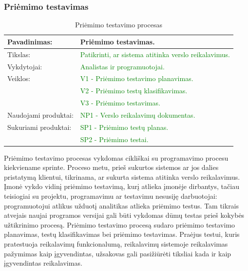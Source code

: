 \documentclass{VUMIFPSkursinis}
\begin{document}
	\subsubsection{Priėmimo testavimas}
	\begin{center}
		\begin{table}[ht]
			\caption{Priėmimo testavimo procesas}
			\begin{tabular}{ | l | l | }
				\hline
				Pavadinimas:		& Priėmimo testavimas.					\\ \hline
				Tikslas:		& \textcolor{green}{Patikrinti, ar sistema atitinka verslo reikalavimus.}	\\ \hline
				Vykdytojai:		& \textcolor{green}{Analistas ir programuotojai.}				\\ \hline
				Veiklos:		&\textcolor{green}{ V1 - Priėmimo testavimo planavimas.	}		\\
							&\textcolor{green}{ V2 - Priėmimo testų klasifikavimas.	}		\\
							& \textcolor{green}{V3 - Priėmimo testavimas.}				\\ \hline
				Naudojami produktai:	& \textcolor{green}{NP1 - Verslo reikalavimų dokumentas.}			\\ \hline
				Sukuriami produktai:	&\textcolor{green}{ SP1 - Priėmimo testų planas.	}			\\
						 	& \textcolor{green}{SP2 - Priėmimo testai.	}			\\ \hline
			\end{tabular}
		\end{table}
	\end{center}
	Priėmimo testavimo procesas vykdomas cikliškai su programavimo procesu kiekviename sprinte.
	Proceso metu, prieš sukurtos sistemos ar jos dalies pristatymą klientui, tikrinama, ar sukurta sistema atitinka verslo reikalavimus.
	Įmonė vykdo vidinį priėmimo testavimą, kurį atlieka įmonėje dirbantys, tačiau teisiogiai su projektu, programavimu ar testavimu nesusiję darbuotojai: programuotojui atlikus užduotį analitikas atlieka priėmimo testus.
	Tam tikrais atvejais naujai programos versijai gali būti vykdomas dūmų testas prieš kokybės užtikrinimo procesą.
	Priėmimo testavimo procesą sudaro priėmimo testavimo planavimas, testų klasifikavimas bei priėmimo testavimas.
	Praėjus testui, kuris pratestuoja reikalavimų funkcionalumą, reikalavimų sistemoje reikalavimas pažymimas kaip įgyvendintas, užsakovas gali pasižiūrėti tiksliai kada ir kaip įgyvendintas reikalavimas.
\end{document}
